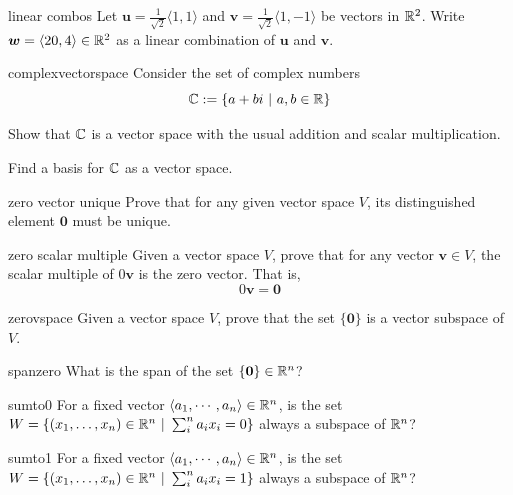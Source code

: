     \begin{problem}{linear combos}
    Let $\bm{u} = \frac{1}{\sqrt{2}}\langle 1, 1 \rangle$ and $\bm{v} = \frac{1}{\sqrt{2}}\langle 1, -1 \rangle$ be vectors in $\mathbb{R}^2$.  Write $\bm{w} = \langle 20, 4 \rangle \in \mathbb{R}^2$ as a linear combination of $\bm{u}$ and $\bm{v}$.
    \end{problem}
    
    
    \begin{problem}{complexvectorspace}
Consider the set of complex numbers $$\mathbb{C} := \{ a + bi \ | \ a, b \in \mathbb{R}\}$$ 

\begin{subproblems}
\item Show that $\mathbb{C}$ is a vector space with the usual addition and scalar multiplication.
\item Find a basis for $\mathbb{C}$ as a vector space.
\end{subproblems}

\end{problem}


\begin{problem}{zero vector unique}
Prove that for any given vector space $V$, its distinguished element $\bm{0}$ must be unique.
\end{problem}

\begin{problem}{zero scalar multiple}
Given a vector space $V$, prove that for any vector $\bm{v} \in V$, the scalar multiple of $0\bm{v}$ is the zero vector.  That is,
$$0\bm{v} = \bm{0}$$
\end{problem}

\begin{problem}{zerovspace}
Given a vector space $V$, prove that the set $\{\bm{0}\}$ is a vector subspace of $V$.
\end{problem}



\begin{problem}{spanzero}
    What is the span of the set $\{\bm{0}\} \in \mathbb{R}^n$?
\end{problem}


\begin{problem}{sumto0}
For a fixed vector $\langle a_1, \cdots, a_n \rangle \in \mathbb{R}^n$, is the set $W = \{(x_1, \dots, x_n) \in \R^n \ | \ \sum^n_i a_ix_i = 0 \}$ always a subspace of $\mathbb{R}^n$?
\end{problem}

\begin{problem}{sumto1}
For a fixed vector $\langle a_1, \cdots, a_n \rangle \in \mathbb{R}^n$, is the set $W = \{(x_1, \dots, x_n) \in \R^n \ | \ \sum^n_i a_ix_i = 1 \}$ always a subspace of $\mathbb{R}^n$?
\end{problem}

